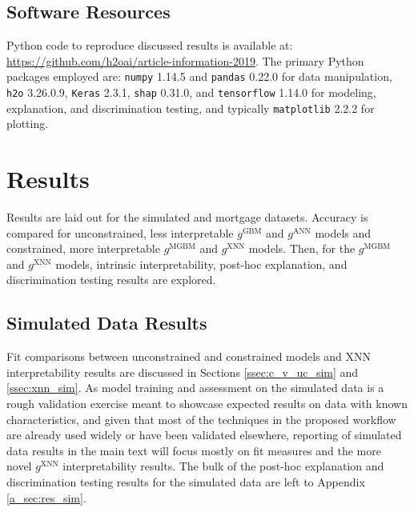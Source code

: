 \documentclass[information,article,accept,moreauthors,pdftex]{Definitions/mdpi}
\begin{document}
\subsection{Software Resources}\label{ssec:soft}



Python code to reproduce discussed results is available at: {\url{https://github.com/h2oai/article-information-2019}}. The primary Python packages employed are:  
{\texttt{{numpy}}} 1.14.5 and 
{\texttt{{pandas}}} 0.22.0 for data manipulation, 
{\texttt{{h2o}}} 3.26.0.9, 
{\texttt{{Keras}}} 2.3.1, 
{\texttt{{shap}}} 0.31.0, and 
{\texttt{{tensorflow}}} 1.14.0 for modeling, explanation, and discrimination testing, and typically 
{\texttt{{matplotlib}}} 2.2.2 for plotting. 


\section{Results}\label{sec:res}

Results are laid out for the simulated and mortgage datasets. Accuracy is compared for unconstrained, less interpretable $g^{\text{GBM}}$ and $g^{\text{ANN}}$ models and constrained, more interpretable $g^{\text{MGBM}}$ and $g^{\text{XNN}}$ models. Then, for the  $g^{\text{MGBM}}$ and $g^{\text{XNN}}$ models, intrinsic interpretability, post-hoc explanation, and discrimination testing results are explored.

\subsection{Simulated Data Results}

Fit comparisons between unconstrained and constrained models and XNN interpretability results are discussed in Sections \ref{ssec:c_v_uc_sim} and \ref{ssec:xnn_sim}. As model training and assessment on the simulated data is a rough validation exercise meant to showcase expected results on data with known characteristics, and given that most of the techniques in the proposed workflow are already used widely or have been validated elsewhere, reporting of simulated data results in the main text will focus mostly on fit measures and the more novel $g^\text{XNN}$ interpretability results. The bulk of the post-hoc explanation and discrimination testing results for the simulated data are left to Appendix \ref{a_sec:res_sim}. 
\end{document}
